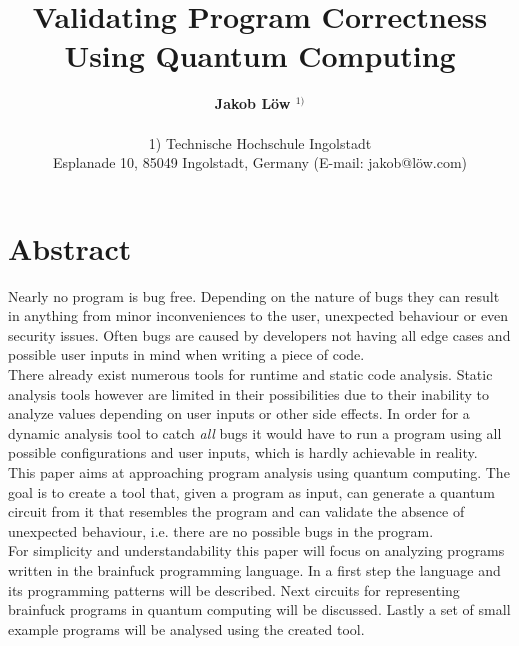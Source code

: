 \documentclass[11pt, a4paper]{article}
\title{Validating Program Correctness Using Quantum Computing}
\author{\textbf{Jakob Löw $^{1)}$} \\
	\\
	1) Technische Hochschule Ingolstadt \\
		Esplanade 10, 85049 Ingolstadt, Germany (E-mail: jakob@löw.com) \\}
\date{}
\begin{document}
\maketitle

\section{Abstract}
Nearly no program is bug free. Depending on the nature of bugs they can result in anything from minor inconveniences to the user, unexpected behaviour or even security issues. Often bugs are caused by developers not having all edge cases and possible user inputs in mind when writing a piece of code. \\
There already exist numerous tools for runtime and static code analysis. Static analysis tools however are limited in their possibilities due to their inability to analyze values depending on user inputs or other side effects. In order for a dynamic analysis tool to catch \textit{all} bugs it would have to run a program using all possible configurations and user inputs, which is hardly achievable in reality. \\
This paper aims at approaching program analysis using quantum computing. The goal is to create a tool that, given a program as input, can generate a quantum circuit from it that resembles the program and can validate the absence of unexpected behaviour, i.e. there are no possible bugs in the program. \\
For simplicity and understandability this paper will focus on analyzing programs written in the brainfuck programming language. In a first step the language and its programming patterns will be described. Next circuits for representing brainfuck programs in quantum computing will be discussed. Lastly a set of small example programs will be analysed using the created tool.
\end{document}
